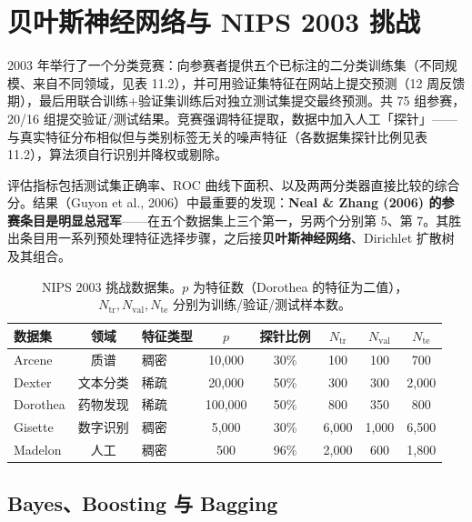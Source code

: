 \section{贝叶斯神经网络与 NIPS 2003 挑战}

2003 年举行了一个分类竞赛：向参赛者提供五个已标注的二分类训练集（不同规模、来自不同领域，见表 11.2），并可用验证集特征在网站上提交预测（12 周反馈期），最后用联合训练+验证集训练后对独立测试集提交最终预测。共 75 组参赛，20/16 组提交验证/测试结果。竞赛强调特征提取，数据中加入人工「探针」——与真实特征分布相似但与类别标签无关的噪声特征（各数据集探针比例见表 11.2），算法须自行识别并降权或剔除。

评估指标包括测试集正确率、ROC 曲线下面积、以及两两分类器直接比较的综合分。结果（Guyon et al., 2006）中最重要的发现：\textbf{Neal \& Zhang (2006) 的参赛条目是明显总冠军}——在五个数据集上三个第一，另两个分别第 5、第 7。其胜出条目用一系列预处理特征选择步骤，之后接\textbf{贝叶斯神经网络}、Dirichlet 扩散树及其组合。

\begin{table}[htbp]
\centering
\caption{NIPS 2003 挑战数据集。$p$ 为特征数（Dorothea 的特征为二值），$N_{\mathrm{tr}}, N_{\mathrm{val}}, N_{\mathrm{te}}$ 分别为训练/验证/测试样本数。}
\label{tab:11_2}
\begin{tabular}{lclccccc}
\toprule
数据集 & 领域 & 特征类型 & $p$ & 探针比例 & $N_{\mathrm{tr}}$ & $N_{\mathrm{val}}$ & $N_{\mathrm{te}}$ \\
\midrule
Arcene & 质谱 & 稠密 & 10{,}000 & 30\% & 100 & 100 & 700 \\
Dexter & 文本分类 & 稀疏 & 20{,}000 & 50\% & 300 & 300 & 2{,}000 \\
Dorothea & 药物发现 & 稀疏 & 100{,}000 & 50\% & 800 & 350 & 800 \\
Gisette & 数字识别 & 稠密 & 5{,}000 & 30\% & 6{,}000 & 1{,}000 & 6{,}500 \\
Madelon & 人工 & 稠密 & 500 & 96\% & 2{,}000 & 600 & 1{,}800 \\
\bottomrule
\end{tabular}
\end{table}

\subsection{Bayes、Boosting 与 Bagging}

